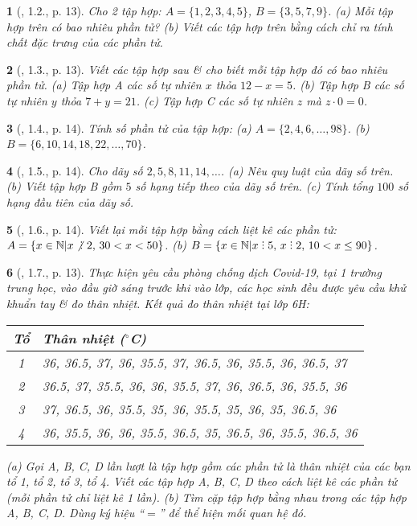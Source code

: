 \documentclass{article}
\newtheorem{baitoan}{}
\DeclareRobustCommand{\divby}{%
	\mathrel{\vbox{\baselineskip.65ex\lineskiplimit0pt\hbox{.}\hbox{.}\hbox{.}}}%
}
\begin{document}
\begin{baitoan}[\cite{Binh_boi_duong_Toan_6_tap_1}, 1.2., p. 13]
	Cho 2 tập hợp: $A = \{1,2,3,4,5\}$, $B = \{3,5,7,9\}$. (a) Mỗi tập hợp trên có bao nhiêu phần tử? (b) Viết các tập hợp trên bằng cách chỉ ra tính chất đặc trưng của các phần tử.
\end{baitoan}

\begin{baitoan}[\cite{Binh_boi_duong_Toan_6_tap_1}, 1.3., p. 13]
	Viết các tập hợp sau \& cho biết mỗi tập hợp đó có bao nhiêu phần tử. (a) Tập hợp A các số tự nhiên $x$ thỏa $12 - x = 5$. (b) Tập hợp B các số tự nhiên $y$ thỏa $7 + y = 21$. (c) Tập hợp C các số tự nhiên $z$ mà $z\cdot0 = 0$.
\end{baitoan}

\begin{baitoan}[\cite{Binh_boi_duong_Toan_6_tap_1}, 1.4., p. 14]
	Tính số phần tử của tập hợp: (a) $A = \{2,4,6,\ldots,98\}$. (b) $B = \{6,10,14,18,22,\ldots,70\}$.
\end{baitoan}

\begin{baitoan}[\cite{Binh_boi_duong_Toan_6_tap_1}, 1.5., p. 14]
	Cho dãy số $2,5,8,11,14,\ldots$. (a) Nêu quy luật của dãy số trên. (b) Viết tập hợp B gồm $5$ số hạng tiếp theo của dãy số trên. (c) Tính tổng $100$ số hạng đầu tiên của dãy số.
\end{baitoan}

\begin{baitoan}[\cite{Binh_boi_duong_Toan_6_tap_1}, 1.6., p. 14]
	Viết lại mỗi tập hợp bằng cách liệt kê các phần tử: $A = \{x\in\mathbb{N}|{x\not{\divby}\ 2},\,30 < x < 50\}$. (b) $B = \{x\in\mathbb{N}|x\divby5,\,x\divby2,\,10 < x\le90\}$.
\end{baitoan}

\begin{baitoan}[\cite{Binh_boi_duong_Toan_6_tap_1}, 1.7., p. 13]
	Thực hiện yêu cầu phòng chống dịch Covid-19, tại 1 trường trung học, vào đầu giờ sáng trước khi vào lớp, các học sinh đều được yêu cầu khử khuẩn tay \& đo thân nhiệt. Kết quả đo thân nhiệt tại lớp 6H:
	\begin{table}[H]
		\centering
		\begin{tabular}{|c|l|}
			\hline
			Tổ & Thân nhiệt (${}^\circ$C) \\
			\hline
			1 & 36, 36.5, 37, 36, 35.5, 37, 36.5, 36, 35.5, 36, 36.5, 37 \\
			\hline
			2 & 36.5, 37, 35.5, 36, 36, 35.5, 37, 36, 36.5, 36, 35.5, 36 \\
			\hline
			3 & 37, 36.5, 36, 35.5, 35, 36, 35.5, 35, 36, 35, 36.5, 36 \\
			\hline
			4 & 36, 35.5, 36, 36, 35.5, 36.5, 35, 36.5, 36, 35.5, 36.5, 36 \\
			\hline
		\end{tabular}
	\end{table}
	\noindent(a) Gọi A, B, C, D lần lượt là tập hợp gồm các phần tử là thân nhiệt của các bạn tổ 1, tổ 2, tổ 3, tổ 4. Viết các tập hợp A, B, C, D theo cách liệt kê các phần tử (mỗi phần tử chỉ liệt kê 1 lần). (b) Tìm cặp tập hợp bằng nhau trong các tập hợp A, B, C, D. Dùng ký hiệu ``$=$'' để thể hiện mối quan hệ đó.
\end{baitoan}
\end{document}
